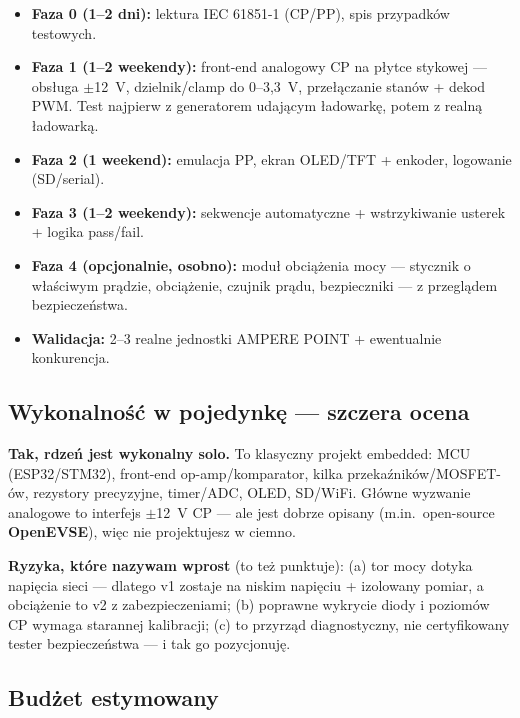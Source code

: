 \documentclass[11pt]{article}
\begin{document}
\begin{itemize}
  \item \textbf{Faza 0 (1--2 dni):} lektura IEC 61851-1 (CP/PP), spis przypadków testowych.
  \item \textbf{Faza 1 (1--2 weekendy):} front-end analogowy CP na płytce stykowej --- obsługa $\pm$12~V, dzielnik/clamp do 0--3,3~V, przełączanie stanów + dekod PWM. Test najpierw z generatorem udającym ładowarkę, potem z realną ładowarką.
  \item \textbf{Faza 2 (1 weekend):} emulacja PP, ekran OLED/TFT + enkoder, logowanie (SD/serial).
  \item \textbf{Faza 3 (1--2 weekendy):} sekwencje automatyczne + wstrzykiwanie usterek + logika pass/fail.
  \item \textbf{Faza 4 (opcjonalnie, osobno):} moduł obciążenia mocy --- stycznik o właściwym prądzie, obciążenie, czujnik prądu, bezpieczniki --- z przeglądem bezpieczeństwa.
  \item \textbf{Walidacja:} 2--3 realne jednostki AMPERE POINT + ewentualnie konkurencja.
\end{itemize}

\subsection{Wykonalność w pojedynkę --- szczera ocena}

\textbf{Tak, rdzeń jest wykonalny solo.} To klasyczny projekt embedded: MCU (ESP32/STM32), front-end op-amp/komparator, kilka przekaźników/MOSFET-ów, rezystory precyzyjne, timer/ADC, OLED, SD/WiFi. Główne wyzwanie analogowe to interfejs $\pm$12~V CP --- ale jest dobrze opisany (m.in.\ open-source \textbf{OpenEVSE}), więc nie projektujesz w ciemno.

\textbf{Ryzyka, które nazywam wprost} (to też punktuje): (a) tor mocy dotyka napięcia sieci --- dlatego v1 zostaje na niskim napięciu + izolowany pomiar, a obciążenie to v2 z zabezpieczeniami; (b) poprawne wykrycie diody i poziomów CP wymaga starannej kalibracji; (c) to przyrząd diagnostyczny, nie certyfikowany tester bezpieczeństwa --- i tak go pozycjonuję.

\subsection{Budżet estymowany}
\end{document}
